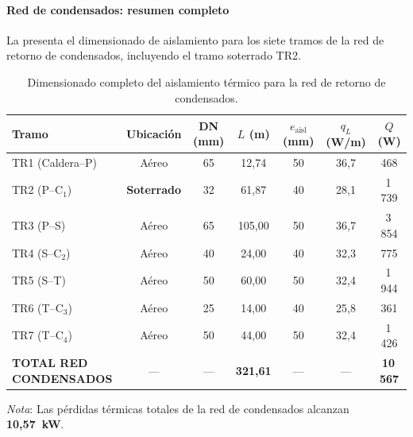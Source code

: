\paragraph{Red de condensados: resumen completo}
\label{par:resumen_cond_completo}

La  presenta el dimensionado de aislamiento para los siete tramos de la red de retorno de condensados, incluyendo el tramo soterrado TR2.

\begin{table}[htbp]
	\centering
	\caption{Dimensionado completo del aislamiento térmico para la red de retorno de condensados.}
	\label{tab:resumen_cond_completo}
	\begin{tabular}{lcccccc}
		\toprule
		\textbf{Tramo}                 & \textbf{Ubicación} & \textbf{DN (mm)} & \textbf{$L$ (m)}  & \textbf{$e_{\text{aisl}}$ (mm)} & \textbf{$q_L$ (W/m)} & \textbf{$Q$ (W)} \\
		\midrule
		TR1 (Caldera--P)               & Aéreo              & 65               & 12{,}74           & 50                              & 36{,}7               & 468              \\
		TR2 (P--C$_1$)                 & \textbf{Soterrado} & 32               & 61{,}87           & 40                              & 28{,}1               & 1\,739           \\
		TR3 (P--S)                     & Aéreo              & 65               & 105{,}00          & 50                              & 36{,}7               & 3\,854           \\
		TR4 (S--C$_2$)                 & Aéreo              & 40               & 24{,}00           & 40                              & 32{,}3               & 775              \\
		TR5 (S--T)                     & Aéreo              & 50               & 60{,}00           & 50                              & 32{,}4               & 1\,944           \\
		TR6 (T--C$_3$)                 & Aéreo              & 25               & 14{,}00           & 40                              & 25{,}8               & 361              \\
		TR7 (T--C$_4$)                 & Aéreo              & 50               & 44{,}00           & 50                              & 32{,}4               & 1\,426           \\
		\midrule
		\textbf{TOTAL RED CONDENSADOS} & ---                & ---              & \textbf{321{,}61} & ---                             & ---                  & \textbf{10\,567} \\
		\bottomrule
	\end{tabular}
	\vspace{0.3cm}

	\noindent \small \textit{Nota}: Las pérdidas térmicas totales de la red de condensados alcanzan \textbf{10{,}57~kW}.
\end{table}


